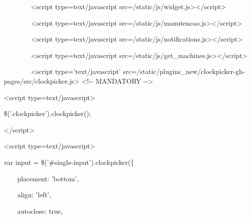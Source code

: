 {\ttfamily\color[rgb]{0.10980392,0.10980392,0.10980392}
    \ \ \ \ \ \ \ \ {\textless}script type={\textquotedbl}text/javascript{\textquotedbl}
    src={\textquotedbl}/static/js/widget.js{\textquotedbl}{\textgreater}{\textless}/script{\textgreater}}

{\ttfamily\color[rgb]{0.10980392,0.10980392,0.10980392}
    \ \ \ \ \ \ \ \ {\textless}script type={\textquotedbl}text/javascript{\textquotedbl}
    src={\textquotedbl}/static/js/manutencao.js{\textquotedbl}{\textgreater}{\textless}/script{\textgreater}}

{\ttfamily\color[rgb]{0.10980392,0.10980392,0.10980392}
    \ \ \ \ \ \ \ \ {\textless}script type={\textquotedbl}text/javascript{\textquotedbl}
    src={\textquotedbl}/static/js/notifications.js{\textquotedbl}{\textgreater}{\textless}/script{\textgreater}}

{\ttfamily\color[rgb]{0.10980392,0.10980392,0.10980392}
    \ \ \ \ \ \ \ \ {\textless}script type={\textquotedbl}text/javascript{\textquotedbl}
    src={\textquotedbl}/static/js/get\_machines.js{\textquotedbl}{\textgreater}{\textless}/script{\textgreater}}

{\ttfamily\color[rgb]{0.10980392,0.10980392,0.10980392}
    \ \ \ \ \ \ \ \ {\textless}script type='text/javascript'
        src={\textquotedbl}/static/plugins\_new/clockpicker-gh-pages/src/clockpicker.js{\textquotedbl}{\textgreater}
    {\textless}!-{}- MANDATORY -{}-{\textgreater}}

{\ttfamily\color[rgb]{0.10980392,0.10980392,0.10980392}
    {\textless}script type={\textquotedbl}text/javascript{\textquotedbl}{\textgreater}}

{\ttfamily\color[rgb]{0.10980392,0.10980392,0.10980392}
    \$('.clockpicker').clockpicker();}

{\ttfamily\color[rgb]{0.10980392,0.10980392,0.10980392}
    {\textless}/script{\textgreater}}

{\ttfamily\color[rgb]{0.10980392,0.10980392,0.10980392}
    {\textless}script type={\textquotedbl}text/javascript{\textquotedbl}{\textgreater}}

{\ttfamily\color[rgb]{0.10980392,0.10980392,0.10980392}
    var input = \$('\#single-input').clockpicker(\{}

            {\ttfamily\color[rgb]{0.10980392,0.10980392,0.10980392}
            \ \ \ \ placement: 'bottom',}

            {\ttfamily\color[rgb]{0.10980392,0.10980392,0.10980392}
            \ \ \ \ align: 'left',}

            {\ttfamily\color[rgb]{0.10980392,0.10980392,0.10980392}
            \ \ \ \ autoclose: true,}

